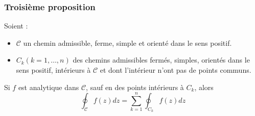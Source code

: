 \subsubsection{Troisième proposition}
Soient :
\begin{itemize}
	\item $\mathcal{C}$ un chemin admissible, ferme, simple et orienté dans le sens
	      positif.
	\item $C_k (k=1,\dots,n)$ des chemins admissibles fermés, simples, orientés dans
	      le sens positif, intérieurs à $\mathcal{C}$ et dont l'intérieur n'ont pas de 
	      points communs.
\end{itemize}
Si $f$ est analytique dans $\mathcal{C}$, sauf en des points intérieurs à $C_k$,
alors 
\begin{equation}
	\oint_\mathcal{C} f(z) dz = \sum_{k=1}^n \oint_{C_k} f(z) dz
\end{equation}
        